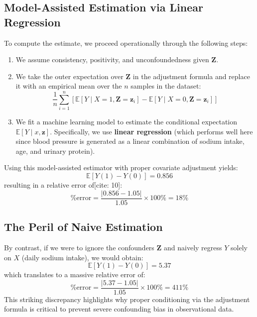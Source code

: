 \subsection{Model-Assisted Estimation via Linear Regression}
To compute the estimate, we proceed operationally through the following steps:
\begin{enumerate}
    \item We assume consistency, positivity, and unconfoundedness given $\mathbf{Z}$.
    \item We take the outer expectation over $\mathbf{Z}$ in the adjustment formula and replace 
    it with an empirical mean over the $n$ samples in the dataset:
    \[
        \frac{1}{n} \sum_{i=1}^{n} \left[ \mathbb{E}[Y \mid X = 1, \mathbf{Z} = \mathbf{z}_i] - \mathbb{E}[Y \mid X = 0, \mathbf{Z} = \mathbf{z}_i] \right]
    \]
    \item We fit a machine learning model to estimate the conditional expectation 
    $\mathbb{E}[Y \mid x, \mathbf{z}]$. Specifically, we use 
    \textbf{linear regression} (which performs well here since blood pressure is generated as a 
    linear combination of sodium intake, age, and urinary protein).
\end{enumerate}
\noindent
Using this model-assisted estimator with proper covariate adjustment yields:
\[
    \mathbb{E}[Y(1) - Y(0)] = 0.856
\]
resulting in a relative error of[cite: 10]:
\[
    \text{\%error} = \frac{|0.856 - 1.05|}{1.05} \times 100\% = 18\%
\]

\subsection{The Peril of Naive Estimation}
By contrast, if we were to ignore the confounders $\mathbf{Z}$ and naively regress $Y$ solely on $X$ (daily sodium intake), we would obtain:
\[
    \mathbb{E}[Y(1) - Y(0)] = 5.37
\]
which translates to a massive relative error of:
\[
    \text{\%error} = \frac{|5.37 - 1.05|}{1.05} \times 100\% = 411\%
\]
This striking discrepancy highlights why proper conditioning via the adjustment formula is critical 
to prevent severe confounding bias in observational data.
